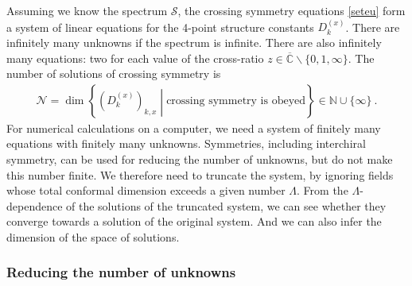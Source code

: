 \documentclass[12pt, a4paper]{article}
\theoremstyle{break}
\begin{document}
Assuming we know the spectrum $\mathcal{S}$, the 
crossing symmetry equations \eqref{seteu} form a system of linear equations for the 4-point structure constants $D^{(x)}_k$. There are infinitely many unknowns if the spectrum is infinite. There are also infinitely many equations: two for each value of the cross-ratio $z\in \overline{\mathbb{C}}\backslash\{0,1,\infty\}$. The number of solutions of crossing symmetry is 
\begin{align}
 \mathcal{N} = \dim\left\{\left(D^{(x)}_k\right)_{k,x}\middle|\text{crossing symmetry is obeyed}\right\}\in \mathbb{N}\cup \{\infty\}\ . 
 \label{nsol}
\end{align}
For numerical calculations on a computer, we need a system of finitely many equations with finitely many unknowns. Symmetries, including interchiral symmetry, can be used for reducing the number of unknowns, but do not make this number finite. We therefore need to truncate the system, by ignoring fields whose total conformal dimension exceeds a given number $\Lambda$. From the $\Lambda$-dependence of the solutions of the truncated system, we can see whether they converge towards a solution of the original system. And we can also infer the dimension of the space of solutions. 

\subsubsection{Reducing the number of unknowns}
\end{document}
